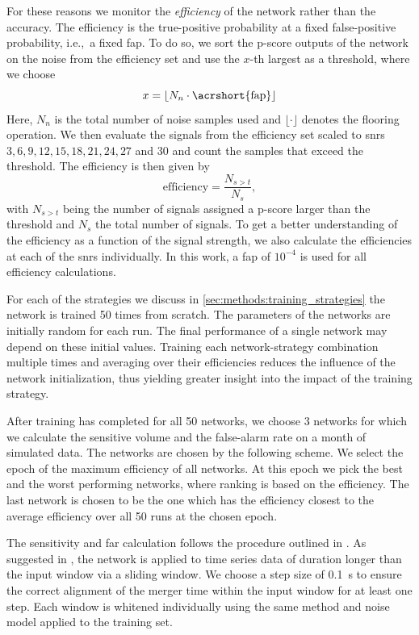 For these reasons we monitor the \textit{efficiency} of the network rather than the accuracy. The efficiency is the true-positive probability at a fixed false-positive probability, i.e.,\ a fixed \acrshort{fap}. To do so, we sort the p-score outputs of the network on the noise from the efficiency set and use the $x$-th largest as a threshold, where we choose
\begin{equation}
    x = \lfloor N_n\cdot \text{\acrshort{fap}} \rfloor
\end{equation}
Here, $N_n$ is the total number of noise samples used and $\lfloor\cdot\rfloor$ denotes the flooring operation. We then evaluate the signals from the efficiency set scaled to \acrshort{snr}s $3, 6, 9, 12, 15, 18, 21, 24, 27$ and $30$ and count the samples that exceed the threshold. The efficiency is then given by
\begin{equation}
    \text{efficiency} = \frac{N_{s>t}}{N_s},
\end{equation}
with $N_{s>t}$ being the number of signals assigned a p-score larger than the threshold and $N_s$ the total number of signals. To get a better understanding of the efficiency as a function of the signal strength, we also calculate the efficiencies at each of the \acrshort{snr}s individually. In this work, a \acrshort{fap} of $10^{-4}$ is used for all efficiency calculations.

For each of the strategies we discuss in \autoref{sec:methods:training_strategies} the network is trained 50 times from scratch. The parameters of the networks are initially random for each run. The final performance of a single network may depend on these initial values. Training each network-strategy combination multiple times and averaging over their efficiencies reduces the influence of the network initialization, thus yielding greater insight into the impact of the training strategy.

After training has completed for all 50 networks, we choose 3 networks for which we calculate the sensitive volume and the false-alarm rate on a month of simulated data. The networks are chosen by the following scheme. We select the epoch of the maximum efficiency of all networks. At this epoch we pick the best and the worst performing networks, where ranking is based on the efficiency. The last network is chosen to be the one which has the efficiency closest to the average efficiency over all 50 runs at the chosen epoch.

The sensitivity and \acrshort{far} calculation follows the procedure outlined in \cite{Schafer:2020kor}. As suggested in \cite{George:2016hay, Gabbard:2017lja}, the network is applied to time series data of duration longer than the input window via a sliding window. We choose a step size of \SI{0.1}{\s} to ensure the correct alignment of the merger time within the input window for at least one step. Each window is whitened individually using the same method and noise model applied to the training set.

